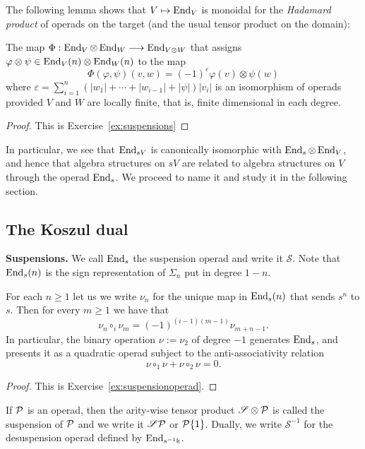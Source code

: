 The following lemma shows that $V\mapsto \operatorname{End}_V$ is 
monoidal for the \emph{Hadamard product} of operads on the
target (and the usual tensor product on the domain): 
 \begin{lemma}\label{lemma:hadamard}
The map $\Phi : \operatorname{End}_V\otimes \operatorname{End}_W\longrightarrow \operatorname{End}_{V\otimes W}$
that assigns $\varphi \otimes \psi \in \operatorname{End}_V(n)\otimes \operatorname{End}_W(n)$
to the map
\[ \Phi(\varphi,\psi)(v,w) = (-1)^\varepsilon \varphi(v)\otimes\psi(w)\]
where $\varepsilon = \sum_{i=1}^n (|w_1| +\cdots + |w_{i-1}|+|\psi|)|v_i|$
is an isomorphism of operads provided $V$ and $W$
are locally finite, that is, finite
dimensional in each degree.
 \end{lemma}
 
 \begin{proof}
 This is Exercise~\ref{ex:suspensions}
 \end{proof}

In particular, we see that $\operatorname{End}_{sV}$ is canonically isomorphic
with $\operatorname{End}_s\otimes \operatorname{End}_V$, and hence that algebra structures on $sV$
are related to algebra structures on $V$ through the operad $\operatorname{End}_s$.
We proceed to name it and study it in the following section.

\subsection{The Koszul dual}

\newcommand{\sus}{\mathscr{S}}
\textbf{Suspensions.} 
We call $\operatorname{End}_{s}$ the suspension operad
and write it $\sus$. Note that $\operatorname{End}_{s}(n)$ is
the sign representation of $\Sigma_n$ put in degree $1-n$.

\begin{proposition} For each $n\geqslant 1$ let us
we write $\nu_n$ for the unique map in $\operatorname{End}_s(n)$ 
that sends $s^n$ to $s$. Then for every $m\geqslant 1$
we have that
\[ \nu_n \circ_i \nu_m = (-1)^{(i-1)(m-1)} \nu_{m+n-1}. \]
In particular, the binary operation $\nu := \nu_2$ of degree
$-1$ generates $\operatorname{End}_s$,
and presents it as a quadratic operad subject to the 
anti-associativity relation
\[ \nu \circ_1\nu + \nu\circ_2 \nu = 0.\]
\end{proposition}
\begin{proof}
 This is Exercise~\ref{ex:suspensionoperad}.
\end{proof}

If $\mathcal P$ is an operad, then the arity-wise tensor product
$\sus\otimes \PP$ is called the suspension of $\mathcal P$
and we write it $\sus\PP$ or $\mathcal P\{1\}$. Dually, we
write $\sus^{-1}$ for the desuspension operad
defined by $\operatorname{End}_{s^{-1}\Bbbk}$. 

